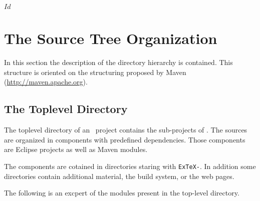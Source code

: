 \SVN$Id$
\chapter{The Source Tree Organization}

In this section the description of the directory hierarchy is
contained. This structure is oriented on the structuring proposed by
Maven (\url{http://maven.apache.org}).


\section{The Toplevel Directory}

The toplevel directory of an \ExTeX\ project contains the sub-projects
of \ExTeX. The sources are organized in components with predefined
dependencies. Those components are Eclipse projects as well as Maven
modules.

The components are cotained in directories staring with
\texttt{ExTeX-}. In addition some directories contain additional
material, the build system, or the web pages.

The following is an excpert of the modules present in the top-level
directory.

